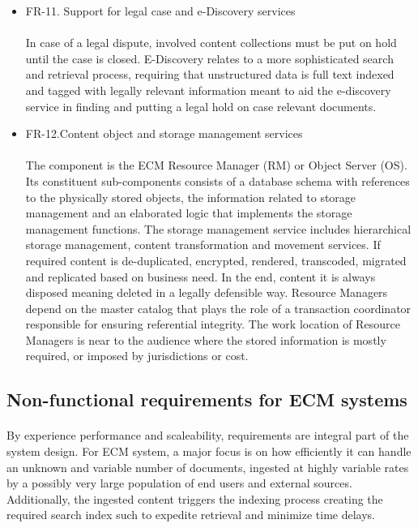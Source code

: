\documentclass[EPiC]{easychair} %
\begin{document}
\begin{itemize}
    \item FR-11. Support for legal case and e-Discovery services  \paragraph{} In case of a legal dispute, involved content collections must be put on hold until the case is closed. E-Discovery relates to a more sophisticated search and retrieval process, requiring that unstructured data is full text indexed and tagged with legally relevant information meant to aid the e-discovery service in finding and putting a legal hold on case relevant documents. 
    \item FR-12.Content object and storage management services \paragraph{} The component is the ECM Resource Manager (RM) or Object Server (OS). Its constituent sub-components consists of a database schema with references to the physically stored objects, the information related to storage management and an elaborated logic that implements the storage management functions. The storage management service includes hierarchical storage management, content transformation and movement services. If required content is de-duplicated, encrypted, rendered, transcoded, migrated and replicated based on business need. In the end, content it is always disposed meaning deleted in a legally defensible way. Resource Managers depend on the master catalog that plays the role of a transaction coordinator responsible for ensuring referential integrity. The work location of Resource Managers is near to the audience where the stored information is mostly required, or imposed by jurisdictions or cost.
\end{itemize}

\subsection{Non-functional requirements for ECM systems} 

\paragraph{} By experience performance and scaleability, requirements are integral part of the system design. For ECM system, a major focus is on how efficiently it can handle an unknown and variable number of documents, ingested at highly variable rates by a possibly very large population of end users and external sources. Additionally, the ingested content triggers the indexing process creating the required search index such to expedite retrieval and minimize time delays. 
\end{document}
